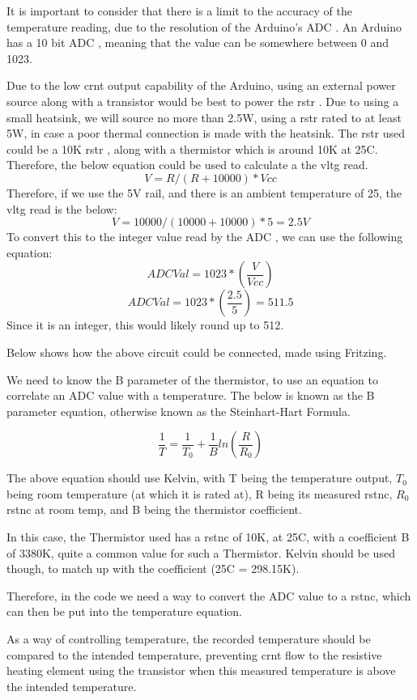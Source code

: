 \documentclass[a4paper,11pt]{report}
\begin{document}
It is important to consider that there is a limit to the accuracy of the temperature reading, due to the resolution of the Arduino's ADC . An Arduino has a 10 bit ADC , meaning that the value can be somewhere between 0 and 1023.

Due to the low \gls{crnt} output capability of the Arduino, using an external power source along with a transistor would be best to power the \gls{rstr} . Due to using a small heatsink, we will source no more than 2.5W, using a \gls{rstr} rated to at least 5W, in case a poor thermal connection is made with the heatsink. The \gls{rstr} used could be a 10K \gls{rstr} , along with a thermistor which is around 10K at 25\degree C. Therefore, the below equation could be used to calculate a the \gls{vltg} read.
\[V = R / (R + 10000) * Vcc\]
Therefore, if we use the 5V rail, and there is an ambient temperature of 25, the \gls{vltg} read is the below:
\[V = 10000/(10000+10000) * 5 = 2.5V\]
To convert this to the integer value read by the ADC , we can use the following equation:
\[ADC Val = 1023*(\frac{V}{Vcc})\]
\[ADC Val = 1023*(\frac{2.5}{5}) = 511.5\]
Since it is an integer, this would likely round up to 512.

Below shows how the above circuit could be connected, made using Fritzing.

We need to know the B parameter of the thermistor, to use an equation to correlate an ADC value with a temperature. The below is known as the B parameter equation, otherwise known as the Steinhart-Hart Formula.

\[\frac{1}{T} = \frac{1}{T_0} + \frac{1}{B}ln(\frac{R}{R_0})\]

The above equation should use Kelvin, with T being the temperature output, $T_0$ being room temperature (at which it is rated at), R being its measured \gls{rstnc}, $R_0$ \gls{rstnc} at room temp, and B being the thermistor coefficient.

In this case, the Thermistor used has a \gls{rstnc} of 10K, at 25\degree C, with a coefficient B of 3380K, quite a common value for such a Thermistor. Kelvin should be used though, to match up with the coefficient (25\degree C = 298.15\degree K).

Therefore, in the code we need a way to convert the ADC value to a \gls{rstnc}, which can then be put into the temperature equation.

As a way of controlling temperature, the recorded temperature should be compared to the intended temperature, preventing \gls{crnt} flow to the resistive heating element using the transistor when this measured temperature is above the intended temperature.
\end{document}
